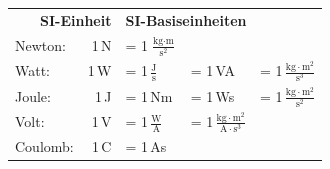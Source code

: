 \section*{}%

{
\begin{tabular}{l r l l l}
    \multicolumn{2}{r}{\textbf{SI-Einheit}} & \multicolumn{3}{l}{\textbf{SI-Basiseinheiten}} \\
    Newton:  & 1\,N & = 1\,$\tfrac{\text{kg}\cdot\text{m}}{\text{s}^2}$ &         &                                                     \\
    Watt:    & 1\,W & = 1\,$\tfrac{\text{J}}{\text{s}}$                 & = 1\,VA & = 1\,$\tfrac{\text{kg}\cdot\text{m}^2}{\text{s}^3}$ \\
    Joule:   & 1\,J & = 1\,Nm                                           & = 1\,Ws & = 1\,$\tfrac{\text{kg}\cdot\text{m}^2}{\text{s}^2}$ \\
    Volt:    & 1\,V & = 1\,$\tfrac{\text{W}}{\text{A}}$                 & = 1\,$\tfrac{\text{kg}\cdot\text{m}^2}{\text{A}\cdot\text{s}^3}$ \\
    Coulomb: & 1\,C & = 1\,As                                           &         &                                                     \\
\end{tabular}}